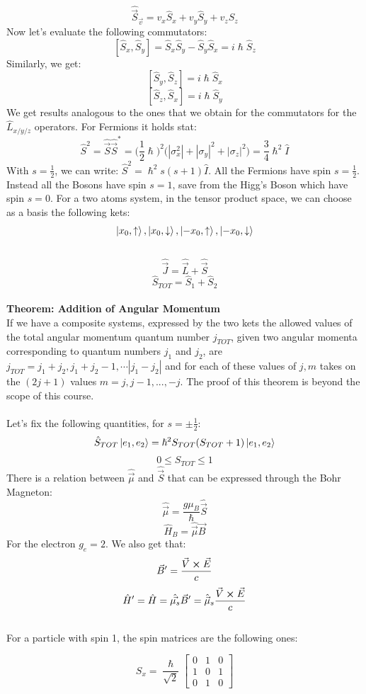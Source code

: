 \documentclass{article}
\begin{document}
$$\hat{\Vec{S}}_{\vec{v}} = v_x \hat{S}_x+ v_y \hat{S}_y + v_z \hat{S}_z  $$
Now let's evaluate the following commutators:
$$ [ \hat{S}_x, \hat{S}_y ] = \hat{S}_x \hat{S}_y - \hat{S}_y\hat{S}_x= i\hslash \hat{S}_z$$
Similarly, we get:
$$[\hat{S}_y, \hat{S}_z] = i \hslash \hat{S}_x$$
$$[\hat{S}_z, \hat{S}_x] = i \hslash \hat{S}_y$$
We get results analogous to the ones that we obtain for the commutators for the $\hat{L}_{x/y/z}$ operators. For Fermions it holds stat:
$$ \hat{S}^2 = \hat{\Vec{S}}\hat{\Vec{S}}^* = \biggl( \frac{1}{2} \hslash \biggl)^2 \bigl( |\sigma_x^2|+ |\sigma_y|^2+ |\sigma_z|^2 \bigl) = \frac{3}{4} \hslash^2 \hat{I}$$
With $s = \frac{1}{2}$, we can write: $\hat{S}^2 = \hslash^2 s(s+1)\hat{I}$.
All the Fermions have spin $s=\frac{1}{2}$. Instead all the Bosons have spin $ s = 1$, save from the Higg's Boson which have spin $s=0$.
For a two atoms system, in the tensor product space, we can choose as a basis the following kets:
$$\ket{x_0, \uparrow}, \ket{x_0, \downarrow}, \ket{-x_0, \uparrow}, \ket{-x_0, \downarrow}$$ \\
$$\hat{\Vec{J}} = \hat{\Vec{L}}+ \hat{\Vec{S}}$$
$$\hat{S}_{TOT} = \hat{S}_1 + \hat{S}_2$$ \\ 
\textbf{Theorem: Addition of Angular Momentum}\\
If we have a composite systems, expressed by the two kets the allowed values of the total angular momentum quantum number $j_{TOT}$, given
two angular momenta corresponding to quantum numbers $j_1$ and $j_2$, are
$j_{TOT} = j_1 + j_2, j_1 + j_2 - 1, \cdots | j_1 - j_2 | $ and for each of these values of $j, m $ takes on the $(2j + 1)$ values
$m = j, j - 1, ... , -j$.
The proof of this theorem is beyond the scope of this course. \\ \\
Let's fix the following quantities, for $s= \pm \frac{1}{2}$:$$\hat{S}_{TOT} \ket{e_1,e_2} = \hslash^2 S_{TOT} (S_{TOT}+1) \ket{e_1,e_2}$$
$$0 \leq S_{TOT} \leq 1$$
There is a relation between $\hat{\Vec{\mu}}$ and $\hat{\Vec{S}}$ that can be expressed through the Bohr Magneton:
$$\hat{\Vec{\mu}} = \frac{g \mu_B}{\hslash} \hat{\Vec{S}}$$
$$\hat{H}_B = \hat{\Vec{\mu}}\Vec{B}$$
For the electron $g_e= 2$. We also get that:
$$\Vec{B}' = \frac{\Vec{V} \cross \Vec{E}}{c}$$
$$\hat{H}' = \hat{H} = \hat{\Vec{\mu_s}} \Vec{B}' = \hat{\Vec{\mu}}_s \frac{\Vec{V}\cross\Vec{E}}{c}$$\\
For a particle with spin 1, the spin matrices are the following ones:

$$
S_x = \frac{\hslash}{\sqrt{2}} \begin{bmatrix}
0 & 1 & 0 \\
1 & 0 & 1 \\
0 & 1 & 0
\end{bmatrix}
$$
\end{document}
